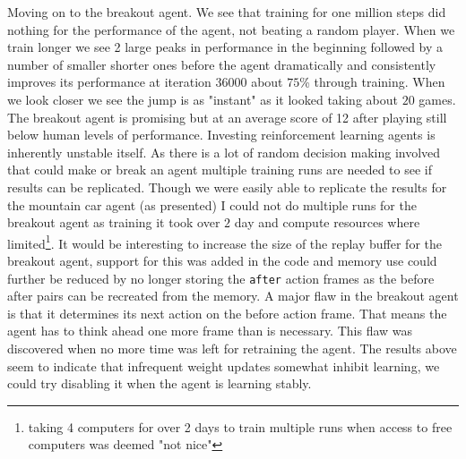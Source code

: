 Moving on to the breakout agent. We see that training for one million steps did nothing for the performance of the agent, not beating a random player. When we train longer we see 2 large peaks in performance in the beginning followed by a number of smaller shorter ones before the agent dramatically and consistently improves its performance at iteration $36000$ about $75$\% through training. When we look closer we see the jump is as "instant" as it looked taking about $20$ games. The breakout agent is promising but at an average score of 12 after playing still below human levels of performance.
%
Investing reinforcement learning agents is inherently unstable itself. As there is a lot of random decision making involved that could make or break an agent multiple training runs are needed to see if results can be replicated. Though we were easily able to replicate the results for the mountain car agent (as presented) I could not do multiple runs for the breakout agent as training it took over $2$ day and compute resources where limited\footnote{taking 4 computers for over 2 days to train multiple runs when access to free computers was deemed "not nice"}.
%
It would be interesting to increase the size of the replay buffer for the breakout agent, support for this was added in the code and memory use could further be reduced by no longer storing the \texttt{after} action frames as the before after pairs can be recreated from the memory. A major flaw in the breakout agent is that it determines its next action on the before action frame. That means the agent has to think ahead one more frame than is necessary. This flaw was discovered when no more time was left for retraining the agent. The results above seem to indicate that infrequent weight updates somewhat inhibit learning, we could try disabling it when the agent is learning stably. 